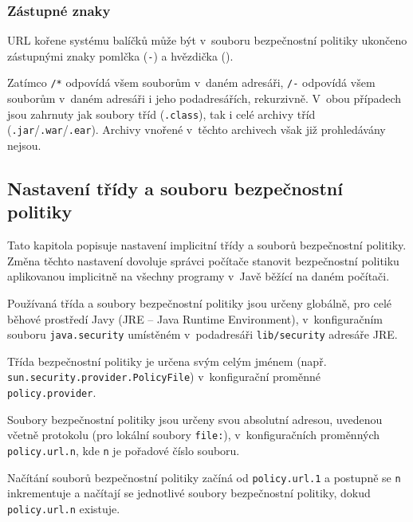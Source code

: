 \subsubsection{Zástupné znaky}

URL kořene systému balíčků může být v~souboru bezpečnostní politiky ukončeno zástupnými znaky pomlčka ({\tt -}) a hvězdička ({\tt *}).

Zatímco {\tt /*} odpovídá všem souborům v~daném adresáři, {\tt /-} odpovídá všem souborům v~daném adresáři i jeho podadresářích, rekurzivně.
V~obou případech jsou zahrnuty jak soubory tříd ({\tt .class}), tak i celé archivy tříd ({\tt .jar}/{\tt .war}/{\tt .ear}).
Archivy vnořené v~těchto archivech však již prohledávány nejsou.
\cite{jdkdocPolicyFiles}

\subsection{Nastavení třídy a souboru bezpečnostní politiky} \label{nastaveniPolitiky}

Tato kapitola popisuje nastavení implicitní třídy a souborů bezpečnostní politiky. Změna těchto nastavení dovoluje správci počítače
stanovit bezpečnostní politiku aplikovanou implicitně na všechny programy v~Javě běžící na daném počítači.

Používaná třída a soubory bezpečnostní politiky jsou určeny globálně, pro celé běhové prostředí Javy (JRE -- Java Runtime Environment),
v~konfiguračním souboru {\tt java.security} umístěném v~podadresáři {\tt lib/security} adresáře JRE.~\cite{refPolicyFiles}

Třída bezpečnostní politiky je určena svým celým jménem (např. {\tt sun.security.provider{\linebreak}.PolicyFile}) v~konfigurační proměnné {\tt policy.provider}.~\cite{refPolicyFiles}

Soubory bezpečnostní politiky jsou určeny svou absolutní adresou, uvedenou včetně protokolu (pro lokální soubory {\tt file:}),
v~konfiguračních proměnných {\tt policy.url.n}, kde {\tt n} je pořadové číslo souboru.~\cite{refPolicyFiles}

Načítání souborů bezpečnostní politiky začíná od {\tt policy.url.1} a postupně se {\tt n} inkrementuje a načítají se jednotlivé soubory bezpečnostní politiky,
dokud {\tt policy.url.n} existuje.~\cite{refPolicyFiles}

